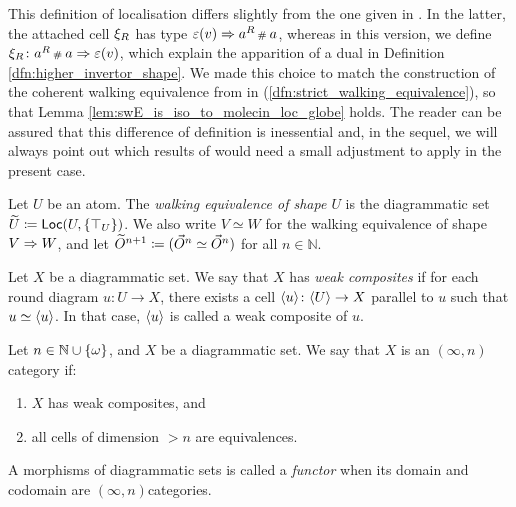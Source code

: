 \begin{comm} \label{comm:diff_of_localisation}
    This definition of localisation differs slightly from the one given in \cite[2.38]{chanavat2024model}. 
    In the latter, the attached cell \( \xi_{R} \) has type \( \varepsilon(v) \Rightarrow a^R \,{\scriptstyle\#}_{}\, a \), whereas in this version, we define \( \xi_{R} \colon a^R \,{\scriptstyle\#}_{}\, a \Rightarrow \varepsilon(v) \), which explain the apparition of a dual in Definition \ref{dfn:higher_invertor_shape}.
    We made this choice to match the construction of the coherent walking equivalence from \cite{hadzihasanovic2024model} in (\ref{dfn:strict_walking_equivalence}), so that Lemma \ref{lem:swE_is_iso_to_molecin_loc_globe} holds.
    The reader can be assured that this difference of definition is inessential and, in the sequel, we will always point out which results of \cite{chanavat2024model} would need a small adjustment to apply in the present case. 
\end{comm}

\begin{dfn} 
    Let \( U \) be an atom.
    The \emph{walking equivalence of shape \( U \)} is the diagrammatic set \( \widetilde{U} \coloneqq \operatorname{\mathsf{Loc}} (U, \left\{ {\top_U} \right\}) \).
    We also write \( V \simeq W \) for the walking equivalence of shape \( V \Rightarrow W \), and let \( \widetilde{O}^{n + 1} \coloneqq (\vec{O}^{n} \simeq \vec{O}^{n}) \) for all \( n \in \mathbb{N} \). 
\end{dfn}

\begin{dfn} 
    Let \( X \) be a diagrammatic set.
    We say that \( X \) has \emph{weak composites} if for each round diagram \( u \colon U \to X \), there exists a cell \( \langle u\rangle \colon \langle U\rangle \to X \) parallel to \( u \) such that \( u \simeq \langle u\rangle \).
    In that case, \( \langle u\rangle \) is called a weak composite of \( u \).
\end{dfn}

\begin{dfn}  \label{dfn:infty_n_cat}
    Let \( n \in \mathbb{N} \cup \left\{ {\omega} \right\} \), and \( X \) be a diagrammatic set.
    We say that \( X \) is an \( (\infty, n) \)\nbd category if:
    \begin{enumerate}
        \item \( X \) has weak composites, and
        \item all cells of dimension \( > n \) are equivalences.
    \end{enumerate}
    A morphisms of diagrammatic sets is called a \emph{functor} when its domain and codomain are \( (\infty, n) \)\nbd categories. 
\end{dfn}


